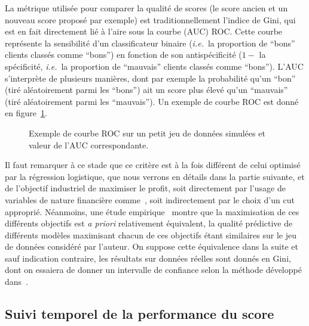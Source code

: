 La métrique utilisée pour comparer la qualité de scores (le score ancien et un nouveau score proposé par exemple) est traditionnellement l'indice de Gini, qui est en fait directement lié à l'aire sous la courbe (AUC) ROC. Cette courbe représente la sensibilité d'un classificateur binaire (\textit{i.e.}\ la proportion de ``bons'' clients classés comme ``bons'') en fonction de son antispécificité ($1-$ la spécificité, \textit{i.e.}\ la proportion de ``mauvais'' clients classés comme ``bons''). L'AUC s'interprète de plusieurs manières, dont par exemple la probabilité qu'un ``bon'' (tiré aléatoirement parmi les ``bons'') ait un score plus élevé qu'un ``mauvais'' (tiré aléatoirement parmi les ``mauvais''). Un exemple de courbe ROC est donné en figure~\ref{fig:ROC}.

\begin{figure}
\centering \scalebox{.8}{}
\caption{\label{fig:ROC} Exemple de courbe ROC sur un petit jeu de données simulées et valeur de l'AUC correspondante.}
\end{figure}

Il faut remarquer à ce stade que ce critère est à la fois différent de celui optimisé par la régression logistique, que nous verrons en détails dans la partie suivante, et de l'objectif industriel de maximiser le profit, soit directement par l'usage de variables de nature financière comme~\cite{finlay2010credit}, soit indirectement par le choix d'un \gls{cut} approprié. Néanmoins, une étude empirique~\cite{finlay2009we} montre que la maximisation de ces différents objectifs est \textit{a priori} relativement équivalent, la qualité prédictive de différents modèles maximisant chacun de ces objectifs étant similaires sur le jeu de données considéré par l'auteur. On suppose cette équivalence dans la suite et sauf indication contraire, les résultats sur données réelles sont donnés en Gini, dont on essaiera de donner un intervalle de confiance selon la méthode développé dans~\cite{cortes2005confidence}.



\subsection{Suivi temporel de la performance du score}

